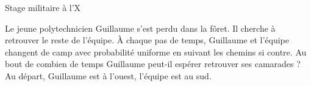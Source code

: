 \documentclass[french, a4paper, 11pt]{article}
\begin{document}
\begin{cadre}{Stage militaire à l'X}
  \begin{minipage}{0.85\linewidth}
  Le jeune polytechnicien Guillaume s'est perdu dans la fôret. Il cherche à retrouver le reste de l'équipe. À chaque pas de temps, Guillaume et l'équipe changent de camp avec probabilité uniforme en suivant les chemins si contre. Au bout de combien de temps Guillaume peut-il espérer retrouver ses camarades ? Au départ, Guillaume est à l'ouest, l'équipe est au sud.
  \end{minipage}
  \begin{minipage}{0.1\linewidth}
  \end{minipage}
\end{cadre}
\end{document}
